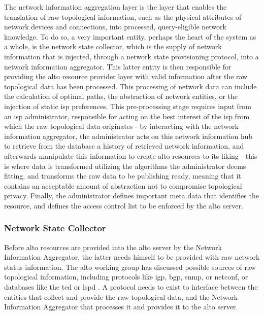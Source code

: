     The network information aggregation layer is the layer that enables the translation of raw topological information, such as the physical attributes of network devices and connections,  into processed, query-eligible network knowledge.
    To do so, a very important entity, perhaps the heart of the system as a whole, is the network state collector, which is the supply of network information that is injected, through a network state provisioning protocol, into a network information aggregator.
    This latter entity is then responsible for providing the \gls{alto} resource provider layer with valid information after the raw topological data has been processed.
    This processing of network data can include the calculation of optimal paths, the abstraction of network entities, or the injection of static \gls{isp} preferences.
    This pre-processing stage requires input from an \gls{isp} administrator, responsible for acting on the best interest of the \gls{isp} from which the raw topological data originates - by interacting with the network information aggregator, the administrator acts on this network information hub to retrieve from the database a history of retrieved network information, and afterwards manipulate this information to create \gls{alto} resources to its liking - this is where data is transformed utilizing the algorithms the administrator deems fitting, and transforms the raw data to be publishing ready, meaning that it contains an acceptable amount of abstraction not to compromise topological privacy.
    Finally, the administrator defines important meta data that identifies the resource, and defines the access control list to be enforced by the \gls{alto} server.

\subsubsection{Network State Collector}

    Before \gls{alto} resources are provided into the \gls{alto} server by the Network Information Aggregator, the latter needs himself to be provided with raw network status information.
    The \gls{alto} working group has discussed possible sources of raw topological information, including protocols like \gls{igp}, \gls{bgp}, \gls{snmp}, or \gls{netconf}, or databases like the \gls{ted} or \gls{lspd} \cite{alto-deployment-considerations}.
    A protocol needs to exist to interface between the entities that collect and provide the raw topological data, and the Network Information Aggregator that processes it and provides it to the \gls{alto} server.

